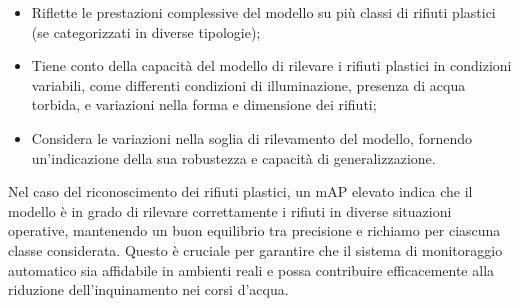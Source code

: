 \begin{itemize}
    \item Riflette le prestazioni complessive del modello su più classi di rifiuti plastici (se categorizzati in diverse tipologie);
    \item Tiene conto della capacità del modello di rilevare i rifiuti plastici in condizioni variabili, come differenti condizioni di illuminazione, presenza di acqua torbida, e variazioni nella forma e dimensione dei rifiuti;
    \item Considera le variazioni nella soglia di rilevamento del modello, fornendo un'indicazione della sua robustezza e capacità di generalizzazione.
\end{itemize}

Nel caso del riconoscimento dei rifiuti plastici, un mAP elevato indica che il modello è in grado di rilevare correttamente i rifiuti in diverse situazioni operative, mantenendo un buon equilibrio tra precisione e richiamo per ciascuna classe considerata. Questo è cruciale per garantire che il sistema di monitoraggio automatico sia affidabile in ambienti reali e possa contribuire efficacemente alla riduzione dell'inquinamento nei corsi d'acqua.